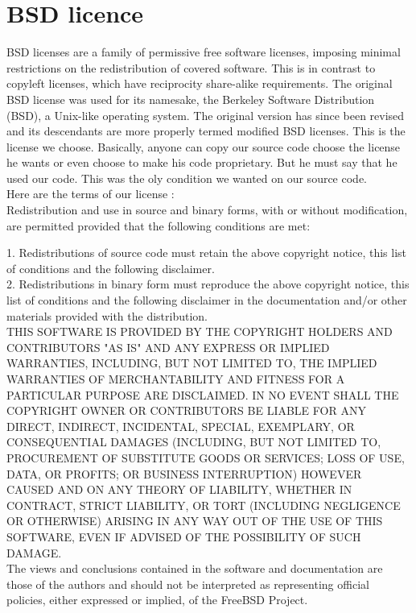 \documentclass[article]{report}             %
\begin{document}
			\section{BSD licence}
				BSD licenses are a family of permissive free software licenses, imposing minimal restrictions on the redistribution of covered software. This is in contrast to copyleft licenses, which have reciprocity share-alike requirements. The original BSD license was used for its namesake, the Berkeley Software Distribution (BSD), a Unix-like operating system. The original version has since been revised and its descendants are more properly termed modified BSD licenses.
				This is the license we choose. Basically, anyone can copy our source code choose the license he wants or even choose to make his code proprietary. But he must say that he used our code. This was the oly condition we wanted on our source code.\\
Here are the terms of our license : \\

Redistribution and use in source and binary forms, with or without
modification, are permitted provided that the following conditions are met: 

1. Redistributions of source code must retain the above copyright notice, this list of conditions and the following disclaimer. \\
2. Redistributions in binary form must reproduce the above copyright notice, this list of conditions and the following disclaimer in the documentation and/or other materials provided with the distribution.\\

THIS SOFTWARE IS PROVIDED BY THE COPYRIGHT HOLDERS AND CONTRIBUTORS "AS IS" AND
ANY EXPRESS OR IMPLIED WARRANTIES, INCLUDING, BUT NOT LIMITED TO, THE IMPLIED
WARRANTIES OF MERCHANTABILITY AND FITNESS FOR A PARTICULAR PURPOSE ARE
DISCLAIMED. IN NO EVENT SHALL THE COPYRIGHT OWNER OR CONTRIBUTORS BE LIABLE FOR
ANY DIRECT, INDIRECT, INCIDENTAL, SPECIAL, EXEMPLARY, OR CONSEQUENTIAL DAMAGES
(INCLUDING, BUT NOT LIMITED TO, PROCUREMENT OF SUBSTITUTE GOODS OR SERVICES;
LOSS OF USE, DATA, OR PROFITS; OR BUSINESS INTERRUPTION) HOWEVER CAUSED AND
ON ANY THEORY OF LIABILITY, WHETHER IN CONTRACT, STRICT LIABILITY, OR TORT
(INCLUDING NEGLIGENCE OR OTHERWISE) ARISING IN ANY WAY OUT OF THE USE OF THIS
SOFTWARE, EVEN IF ADVISED OF THE POSSIBILITY OF SUCH DAMAGE.\\

The views and conclusions contained in the software and documentation are those
of the authors and should not be interpreted as representing official policies, 
either expressed or implied, of the FreeBSD Project.\\
\end{document}
